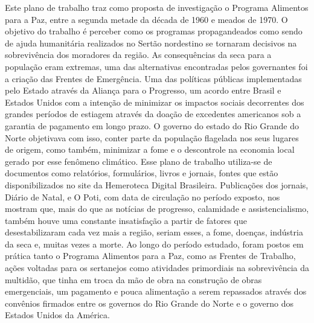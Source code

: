 \begin{refsection}
    \begin{galoResumo}
         Este plano de trabalho traz como proposta de investigação o Programa Alimentos para a Paz, entre a segunda metade da década de 1960 e meados de 1970. O objetivo do trabalho é perceber como os programas propagandeados como sendo de ajuda humanitária realizados no Sertão nordestino se tornaram decisivos na sobrevivência dos moradores da região. As consequências da seca para a população eram extremas, uma das alternativas encontradas pelos governantes foi a criação das Frentes de Emergência. Uma das políticas públicas implementadas pelo Estado através da Aliança para o Progresso, um acordo entre Brasil e Estados Unidos com a intenção de minimizar os impactos sociais decorrentes dos grandes períodos de estiagem através da doação de excedentes americanos sob a garantia de pagamento em longo prazo. O governo do estado do Rio Grande do Norte objetivava com isso, conter parte da população flagelada nos seus lugares de origem, como também, minimizar a fome e o descontrole na economia local gerado por esse fenômeno climático. Esse plano de trabalho utiliza-se de documentos como relatórios, formulários, livros e jornais, fontes que estão disponibilizados no site da Hemeroteca Digital Brasileira. Publicações dos jornais, Diário de Natal, e O Poti, com data de circulação no período exposto, nos mostram que, mais do que as notícias de progresso, calamidade e assistencialismo, também houve uma constante insatisfação a partir de fatores que desestabilizaram cada vez mais a região, seriam esses, a fome, doenças, indústria da seca e, muitas vezes a morte. Ao longo do período estudado, foram postos em prática tanto o Programa Alimentos para a Paz, como as Frentes de Trabalho, ações voltadas para os sertanejos como atividades primordiais na sobrevivência da multidão, que tinha em troca da mão de obra na construção de obras emergenciais, um pagamento e pouca alimentação a serem repassados através dos convênios firmados entre os governos do Rio Grande do Norte e o governo dos Estados Unidos da América.
    \end{galoResumo}
    \mednobreak


\end{refsection}
